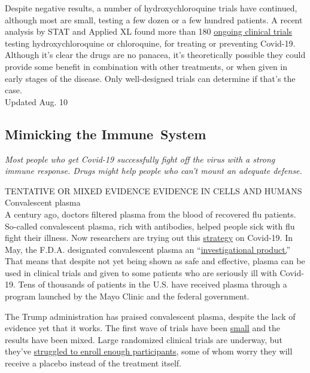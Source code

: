 Despite negative results, a number of hydroxychloroquine trials have
continued, although most are small, testing a few dozen or a few hundred
patients. A recent analysis by STAT and Applied XL found more than 180
\href{https://www.statnews.com/2020/07/06/data-show-panic-and-disorganization-dominate-the-study-of-covid-19-drugs/}{ongoing
clinical trials} testing hydroxychloroquine or chloroquine, for treating
or preventing Covid-19. Although it's clear the drugs are no panacea,
it's theoretically possible they could provide some benefit in
combination with other treatments, or when given in early stages of the
disease. Only well-designed trials can determine if that's the case.\\
Updated Aug. 10

\hypertarget{mimicking-the-immune-system}{%
\subsection{Mimicking the
Immune~System}\label{mimicking-the-immune-system}}

\emph{Most people who get Covid-19 successfully fight off the virus with
a strong immune response. Drugs might help people who can't mount an
adequate defense.}

TENTATIVE OR MIXED EVIDENCE EVIDENCE IN CELLS AND HUMANS\\
Convalescent plasma\\
A century ago, doctors filtered plasma from the blood of recovered flu
patients. So-called convalescent plasma, rich with antibodies, helped
people sick with flu fight their illness. Now researchers are trying out
this
\href{https://www.nytimes3xbfgragh.onion/2020/04/24/smarter-living/coronavirus-convalescent-plasma-antibodies.html?searchResultPosition=1}{strategy}
on Covid-19. In May, the F.D.A. designated convalescent plasma an
``\href{https://www.fda.gov/vaccines-blood-biologics/investigational-new-drug-ind-or-device-exemption-ide-process-cber/recommendations-investigational-covid-19-convalescent-plasma}{investigational
product.}'' That means that despite not yet being shown as safe and
effective, plasma can be used in clinical trials and given to some
patients who are seriously ill with Covid-19. Tens of thousands of
patients in the U.S. have received plasma through a program launched by
the Mayo Clinic and the federal government.

The Trump administration has praised convalescent plasma, despite the
lack of evidence yet that it works. The first wave of trials have been
\href{https://www.nytimes3xbfgragh.onion/2020/05/22/health/coronarvirus-convalescent-serum.html?searchResultPosition=2}{small}
and the results have been mixed. Large randomized clinical trials are
underway, but they've
\href{https://www.nytimes3xbfgragh.onion/2020/08/04/health/trump-plasma.html}{struggled
to enroll enough participants}, some of whom worry they will receive a
placebo instead of the treatment itself.

